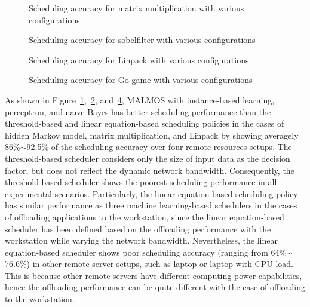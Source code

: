 {{\begin{figure}
\label{fig:scheduling_hmm}
\end{figure}
%
\begin{figure}
\centering
{}
\caption{Scheduling accuracy for matrix multiplication with various
configurations}
\label{fig:scheduling_matrix}
\end{figure}
%
\begin{figure}
\centering
{}
\caption{Scheduling accuracy for sobelfilter with various
configurations}
\label{fig:scheduling_sobel}
\end{figure}
%
\begin{figure}
\centering
{}
\caption{Scheduling accuracy for Linpack with various
configurations}
\label{fig:scheduling_linpack}
\end{figure}
%
\begin{figure}
\centering
{}
\caption{Scheduling accuracy for Go game with various
configurations}
\label{fig:scheduling_gogame}
\end{figure}
%
As shown in
Figure~\ref{fig:scheduling_hmm},~\ref{fig:scheduling_matrix},
and~\ref{fig:scheduling_linpack}, MALMOS with
instance-based learning, perceptron, and na\"{i}ve Bayes has better
scheduling performance than the threshold-based and linear
equation-based scheduling policies in the cases of hidden Markov model,
matrix multiplication, and Linpack by showing averagely 86\%$\sim$92.5\% of the
scheduling accuracy over four remote resources setups.
%
The threshold-based scheduler considers only the
size of input data as the decision factor, but does not reflect the
dynamic network bandwidth.
%
Consequently, the threshold-based scheduler shows the poorest scheduling
performance in all experimental scenarios.
%
Particularly, the linear equation-based scheduling policy has similar
performance as three machine learning-based schedulers in the cases of
offloading applications to the workstation, since the linear
equation-based scheduler has been defined based on the offloading
performance with the workstation while varying the network bandwidth.
%
Nevertheless, the linear equation-based scheduler shows poor
scheduling accuracy (ranging from 64\%$\sim$76.6\%) in other remote server
setups, such as laptop or laptop with CPU load.
%
This is because other remote servers have different computing power
capabilities, hence the offloading performance can be quite different
with the case of offloading to the workstation.\\
}}
